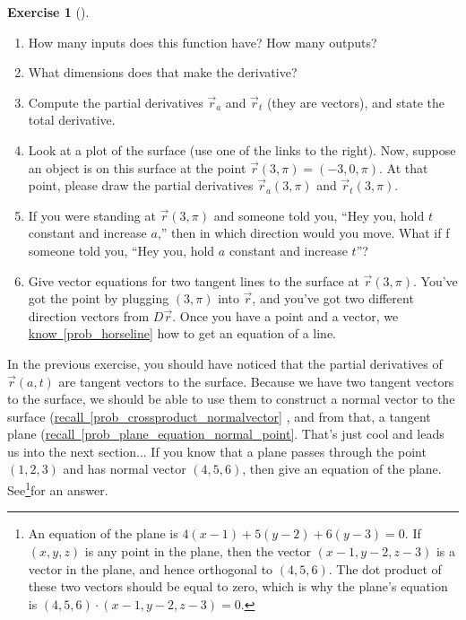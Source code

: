 \documentclass[10pt,]{book}
\theoremstyle{plain}
\theoremstyle{definition}
\theoremstyle{definition}
\theoremstyle{definition}
\theoremstyle{definition}
\newtheorem{exploration}[project]{Exercise}
\theoremstyle{definition}
\numberwithin{equation}{section}
\begin{document}
\begin{exploration}[]\label{exploration-139}
\leavevmode%
\begin{enumerate}[font=\bfseries,label=(\alph*),ref=\alph*]
\item\label{task-300} How many inputs does this function have? How many outputs?%
\item\label{task-301} What dimensions does that make the derivative?%
\item\label{task-302} Compute the partial derivatives \(\vec r_a\) and \(\vec r_t\) (they are vectors), and state the total derivative.%
\item\label{task-303} Look at a plot of the surface (use one of the links to the right). Now, suppose an object is on this surface at the point \(\vec r(3,\pi) = (-3,0,\pi)\). At that point, please draw the partial derivatives \(\vec r_a(3,\pi)\) and \(\vec r_t(3,\pi)\). %
\item\label{task-304} If you were standing at \(\vec r(3,\pi)\) and someone told you, ``Hey you, hold \(t\) constant and increase \(a\),'' then in which direction would you move. What if f someone told you, ``Hey you, hold \(a\) constant and increase \(t\)''?%
\item\label{task-305} Give vector equations for two tangent lines to the surface at \(\vec r(3,\pi)\). You've got the point by plugging \((3,\pi)\) into \(\vec r\), and you've got two different direction vectors from \(D\vec r\). Once you have a point and a vector, we \hyperref[prob_horseline]{know~\ref{prob_horseline}} how to get an equation of a line.%
%
\end{enumerate}
\end{exploration}
In the previous exercise, you should have noticed that the partial derivatives of \(\vec r(a,t)\) are tangent vectors to the surface. Because we have two tangent vectors to the surface, we should be able to use them to construct a normal vector to the surface (\hyperref[prob_crossproduct_normalvector]{recall~\ref{prob_crossproduct_normalvector}} , and from that, a tangent plane (\hyperref[prob_plane_equation_normal_point]{recall~\ref{prob_plane_equation_normal_point}}. That's just cool and leads us into the next section...%
If you know that a plane passes through the point \((1,2,3)\) and has normal vector \((4,5,6)\), then give an equation of the plane. See\footnote{An equation of the plane is \(4(x-1)+5(y-2)+6(y-3)=0\). If \((x,y,z)\) is any point in the plane, then the vector \((x-1,y-2,z-3)\) is a vector in the plane, and hence orthogonal to \((4,5,6)\). The dot product of these two vectors should be equal to zero, which is why the plane's equation is \((4,5,6)\cdot (x-1,y-2,z-3)=0\).\label{fn-2}}for an answer.%
\end{document}
